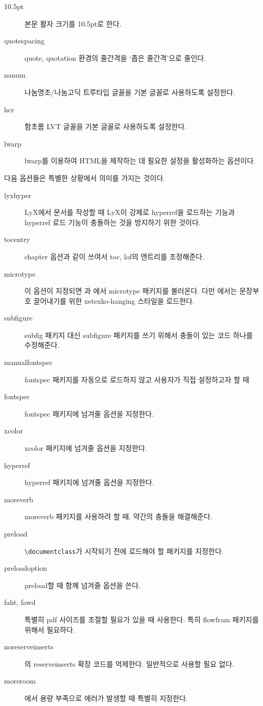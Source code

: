 \documentclass[
	12pt,
	a4paper,
	kosection,
	footnote,
	microtype,
	figtabcapt,
]{oblivoir}
\newcommand\obclass{ob\-liv\-oir\oblivoirallowbreak}
\begin{document}
\begin{description}
\item [10.5pt] 본문 활자 크기를 10.5pt로 한다.
\item [quotespacing] quote, quotation 환경의 줄간격을 `좁은 줄간격'으로 줄인다.
\item [nanum] 나눔명조/나눔고딕 트루타입 글꼴을 기본 글꼴로 사용하도록 설정한다.
\item [hcr]   함초롬 LVT 글꼴을 기본 글꼴로 사용하도록 설정한다.
\item [lwarp] \textsf{lwarp}를 이용하여 HTML을 제작하는 데 필요한 설정을 활성화하는 옵션이다.
\end{description}

\bigskip

다음 옵션들은 특별한 상황에서 의미를 가지는 것이다.
\begin{description}
\item [lyxhyper] LyX에서 문서를 작성할 때 LyX이 강제로 hyperref을 로드하는 기능과  hyperref 로드 기능이 충돌하는 것을 방지하기 위한 것이다.
\item [tocentry] chapter 옵션과 같이 쓰여서 toc, lof의 엔트리를 조정해준다.
\item [microtype] 이 옵션이 지정되면 과 에서 microtype 패키지를 불러온다. 다만 에서는 문장부호 끌어내기를 위한 xetexko-hanging 스타일을 로드한다.
\item [subfigure] subfig 패키지 대신 subfigure 패키지를 쓰기 위해서 충돌이 있는 코드 하나를 수정해준다.
\item [manualfontspec] fontspec 패키지를 자동으로 로드하지 않고 사용자가 직접 설정하고자 할 때
\item [fontspec] fontspec 패키지에 넘겨줄 옵션을 지정한다.
\item [xcolor] xcolor 패키지에 넘겨줄 옵션을 지정한다.
\item [hyperref] hyperref 패키지에 넘겨줄 옵션을 지정한다.
\item [moreverb] moreverb 패키지를 사용하려 할 때. 약간의 충돌을 해결해준다.
\item [preload] \verb|\documentclass|가 시작되기 전에 로드해야 할 패키지를 지정한다.
\item [preloadoption] preload할 때 함께 넘겨줄 옵션을 쓴다.
\item [faht, fawd] 특별히 pdf 사이즈를 조절할 필요가 있을 때 사용한다. 특히 flowfram 패키지를 위해서 필요하다.
\item [noreserveinserts] 의 reserveinserts 확장 코드를 억제한다. 일반적으로 사용할 필요 없다.
\item [moreroom] 에서 용량 부족으로 에러가 발생할 때 특별히 지정한다.
\end{description}
\end{document}
